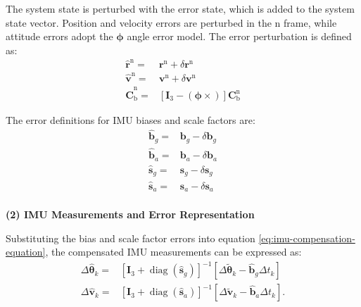 \documentclass{article}
\begin{document}
The system state is perturbed with the error state, which is added to the system state vector. Position and velocity errors are perturbed in the $\mathrm{n}$ frame, while attitude errors adopt the $\boldsymbol{\phi}$ angle error model. The error perturbation is defined as:
\begin{equation}
    \begin{aligned}
        \hat{\boldsymbol{r}}^{\mathrm{n}}  = & \boldsymbol{r}^{\mathrm{n}} + \delta \boldsymbol{r}^{\mathrm{n}} \\
        \hat{\boldsymbol{v}}^{\mathrm{n}}  = & \boldsymbol{v}^{\mathrm{n}} + \delta \boldsymbol{v}^{\mathrm{n}} \\
        \hat{\mathbf{C}}_{\mathrm{b}}^{\mathrm{n}}  = & \left[\boldsymbol{I}_{3} - \left(\boldsymbol{\phi}\times\right)\right]\mathbf{C}_{\mathrm{b}}^{\mathrm{n}}
    \end{aligned}
    \label{eq:state-error-perturbance-definition}
\end{equation}

The error definitions for IMU biases and scale factors are:
\begin{equation}
    \begin{aligned}
        \hat{\boldsymbol{b}}_{g} = & \boldsymbol{b}_{g} - \delta \boldsymbol{b}_{g} \\
        \hat{\boldsymbol{b}}_{a} = & \boldsymbol{b}_{a} - \delta \boldsymbol{b}_{a} \\  
        \hat{\boldsymbol{s}}_{g} = & \boldsymbol{s}_{g} - \delta \boldsymbol{s}_{g} \\
        \hat{\boldsymbol{s}}_{a} = & \boldsymbol{s}_{a} - \delta \boldsymbol{s}_{a} \\
    \end{aligned}
\end{equation}

\textbf{(2) IMU Measurements and Error Representation}

Substituting the bias and scale factor errors into equation \eqref{eq:imu-compensation-equation}, the compensated IMU measurements can be expressed as:
\begin{equation}
    \begin{aligned}
        \Delta \hat{\boldsymbol{\theta}}_{k} =& \left[ \boldsymbol{I}_{3} + \operatorname{diag}(\hat{\boldsymbol{s}}_{g})\right]^{-1} \left[ \Delta \tilde{\boldsymbol{\theta}}_{k} - \hat{\boldsymbol{b}}_{g} \Delta t_{k}\right] \\
        \Delta \hat{\boldsymbol{v}}_{k} =& \left[ \boldsymbol{I}_{3} + \operatorname{diag}(\hat{\boldsymbol{s}}_{a})\right]^{-1} \left[ \Delta \tilde{\boldsymbol{v}}_{k} - \hat{\boldsymbol{b}}_{a} \Delta t_{k} \right].
    \end{aligned}
\end{equation}
\end{document}
